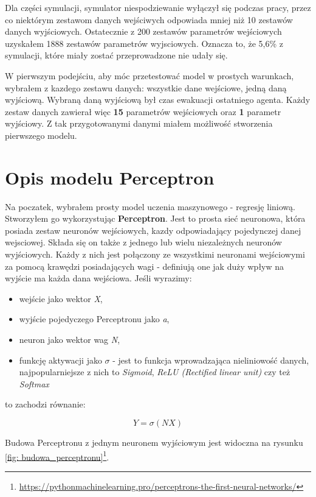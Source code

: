 \documentclass[12pt]{aghdpl}
\begin{document}
		Dla części symulacji, symulator niespodziewanie wyłączył się podczas pracy, przez co niektórym zestawom danych wejściwych odpowiada mniej niż 10 zestawów danych wyjściowych. Ostatecznie z 200 zestawów parametrów wejściowych uzyskałem 1888 zestawów parametrów wyjsciowych. Oznacza to, że 5,6\% z symulacji, które miały zostać przeprowadzone nie udały się.	
		
		W pierwszym podejściu, aby móc przetestować model w prostych warunkach, wybrałem z kazdego zestawu danych: wszystkie dane wejściowe, jedną daną wyjściową. Wybraną daną wyjściową był czas ewakuacji ostatniego agenta. Każdy zestaw danych zawierał więc \textbf{15} parametrów wejściowych oraz \textbf{1} parametr wyjściowy. Z tak przygotowanymi danymi miałem możliwość stworzenia pierwszego modelu.
		
		\section{Opis modelu Perceptron}		
		Na poczatek, wybrałem prosty model uczenia maszynowego - regresję liniową. Stworzyłem go wykorzystując \textbf{Perceptron}. Jest to prosta sieć neuronowa, która posiada zestaw neuronów wejściowych, kazdy odpowiadający pojedynczej danej wejsciowej. Składa się on także z jednego lub wielu niezależnych neuronów wyjściowych. Każdy z nich jest połączony ze wszystkimi neuronami wejściowymi za pomocą krawędzi posiadających wagi - definiują one jak duży wpływ na wyjście ma każda dana wejściowa. Jeśli wyrazimy:
		\begin{itemize}
		\item wejście jako wektor \textit{X},
		\item wyjście pojedyczego Perceptronu jako \textit{a},
		\item neuron jako wektor wag \textit{N},
		\item funkcję aktywacji jako $\sigma$ - jest to funkcja wprowadzająca nieliniowość danych, najpopularniejsze z nich to \textit{Sigmoid}, \textit{ReLU (Rectified linear unit)} czy też \textit{Softmax}
		\end{itemize}
		to zachodzi równanie:
		
		\begin{equation}
		Y=\sigma(NX)
		\end{equation}
	
		Budowa Perceptronu z jednym neuronem wyjściowym jest widoczna na rysunku \ref{fig: budowa_perceptronu}\footnote{\url{https://pythonmachinelearning.pro/perceptrons-the-first-neural-networks/}}.
\end{document}
